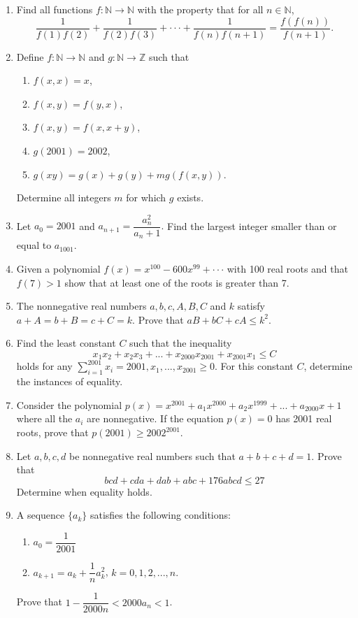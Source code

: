 \documentclass[12pt]{scrartcl}
\begin{document}
\begin{enumerate}
    \item Find all functions $f:\mathbb{N}\rightarrow\mathbb{N}$ with the property that for all $n\in\mathbb{N}$,
    $$\dfrac{1}{f(1)f(2)}+\dfrac{1}{f(2)f(3)}+\cdot\cdot\cdot+\dfrac{1}{f(n)f(n+1)}=\dfrac{f(f(n))}{f(n+1)}.$$

    \item Define $f:\mathbb{N}\rightarrow\mathbb{N}$ and $g:\mathbb{N}\rightarrow\mathbb{Z}$ such that
    \begin{enumerate}
        \item[(a)] $f(x,x)=x$,
        \item[(b)] $f(x,y)=f(y,x)$,
        \item[(c)] $f(x,y)=f(x,x+y)$,
        \item[(d)] $g(2001)=2002$,
        \item[(e)] $g(xy)=g(x)+g(y)+mg(f(x,y))$.
    \end{enumerate}
    Determine all integers $m$ for which $g$ exists.

    \item Let $a_{0}=2001$ and $a_{n+1}=\dfrac{a_{n}^{2}}{a_{n}+1}.$ Find the largest integer smaller than or equal to $a_{1001}$.

    \item Given a polynomial $f(x)=x^{100}-600x^{99}+\cdot\cdot\cdot$ with 100 real roots and that $f(7)>1$ show that at least one of the roots is greater than 7.

    \item The nonnegative real numbers $a, b, c, A, B, C$ and $k$ satisfy $a+A=b+B=c+C=k$. Prove that $aB+bC+cA\le k^{2}$.

    \item Find the least constant $C$ such that the inequality 
    $$x_{1}x_{2}+x_{2}x_{3}+...+x_{2000}x_{2001}+x_{2001}x_{1}\le C$$ 
    holds for any $\sum_{i=1}^{2001}x_{i}=2001, x_{1},...,x_{2001}\ge0$. For this constant $C$, determine the instances of equality.

    \item Consider the polynomial $p(x)=x^{2001}+a_{1}x^{2000}+a_{2}x^{1999}+...+a_{2000}x+1$ where all the $a_{i}$ are nonnegative. If the equation $p(x)=0$ has 2001 real roots, prove that $p(2001)\ge2002^{2001}$.

    \item Let $a, b, c, d$ be nonnegative real numbers such that $a+b+c+d=1.$ Prove that 
    $$bcd + cda + dab+abc+ 176 abcd \le 27$$ 
    Determine when equality holds.

    \item A sequence $\{a_{k}\}$ satisfies the following conditions:
    \begin{enumerate}
        \item[(a)] $a_{0}=\dfrac{1}{2001}$
        \item[(b)] $a_{k+1}=a_{k}+\dfrac{1}{n}a_{k}^{2}$, $k=0,1,2,...,n.$
    \end{enumerate}
    Prove that $1-\dfrac{1}{2000n}<2000a_{n}<1$.
\end{enumerate}
\end{document}
